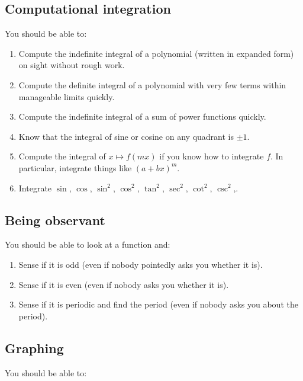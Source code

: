 \documentclass[10pt]{amsart}
\begin{document}
\subsection{Computational integration}

You should be able to:

\begin{enumerate}
\item Compute the indefinite integral of a polynomial (written in
  expanded form) on sight without rough work.
\item Compute the definite integral of a polynomial with very few
  terms within manageable limits quickly.
\item Compute the indefinite integral of a sum of power functions
  quickly.
\item Know that the integral of sine or cosine on any quadrant is $\pm
  1$.
\item Compute the integral of $x \mapsto f(mx)$ if you know how to
  integrate $f$. In particular, integrate things like $(a + bx)^m$.
\item Integrate $\sin$, $\cos$, $\sin^2$, $\cos^2$, $\tan^2$,
  $\sec^2$, $\cot^2$, $\csc^2$,.
\end{enumerate}
\subsection{Being observant}

You should be able to look at a function and:

\begin{enumerate}
\item Sense if it is odd (even if nobody pointedly asks you whether it
  is).
\item Sense if it is even (even if nobody asks you whether it is).
\item Sense if it is periodic and find the period (even if nobody asks
  you about the period).
\end{enumerate}

\subsection{Graphing}

You should be able to:
\end{document}
